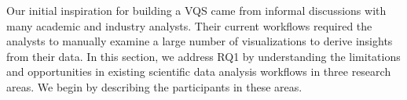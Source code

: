 \par Our initial inspiration for building a VQS came from informal discussions with many academic and industry analysts. Their current workflows required the analysts to manually examine a large number of visualizations to derive insights from their data. In this section, we address RQ1 by understanding the limitations and opportunities in existing scientific data analysis workflows in three research areas. We begin by describing the participants in these areas.
